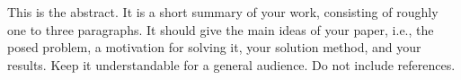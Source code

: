 \chapter{\abstractname}
This is the abstract. It is a short summary of your work, consisting of roughly one to three paragraphs. It should give the main ideas of your paper, i.e., the posed problem, a motivation for solving it, your solution method, and your results. Keep it understandable for a general audience. Do not include references.